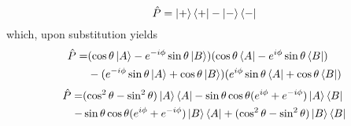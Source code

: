 \documentclass[11pt,letterpaper]{article}
\begin{document}
\begin{enumerate}
\begin{enumerate}
$$\hat P = \ket +\bra + -\ket -\bra-$$
which, upon substitution yields
\begin{align*}\hat P = &(\cos\theta\ket A-e^{-i\phi}\sin\theta\ket B)(\cos\theta\bra A-e^{i\phi}\sin\theta\bra B)\\&-(e^{-i\phi}\sin\theta\ket A + \cos\theta\ket B)(e^{i\phi}\sin\theta\bra A+\cos\theta\bra B)\end{align*}
\begin{align*}\hat P =&(\cos^2\theta -\sin^2\theta)\ket A\bra A -\sin\theta\cos\theta(e^{i\phi}+e^{-i\phi}) \ket A \bra B
\\-&\sin\theta\cos\theta(e^{i\phi}+e^{-i\phi})\ket B\bra A +(\cos^2\theta-\sin^2\theta)\ket B\bra B\end{align*}

\end{enumerate}


\end{enumerate}
\end{document}
